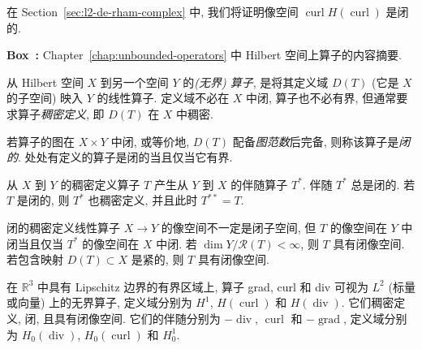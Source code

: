 在 Section~\ref{sec:l2-de-rham-complex} 中, 我们将证明像空间 $\operatorname{curl}H(\operatorname{curl})$ 是闭的.
\newpage
\begin{MBSourceBox}
\label{box:unbounded-operators-summary}
\noindent\textbf{Box~\thebooksummary:} {Chapter~\ref{chap:unbounded-operators} 中 Hilbert 空间上算子的内容摘要.}\par

从 Hilbert 空间 $X$ 到另一个空间 $Y$ 的\emph{(无界) 算子}, 是将其定义域 $D(T)$ (它是 $X$ 的子空间) 映入 $Y$ 的线性算子. 定义域不必在 $X$ 中闭, 算子也不必有界, 但通常要求算子\emph{稠密定义}, 即 $D(T)$ 在 $X$ 中稠密.

若算子的图在 $X\times Y$ 中闭, 或等价地, $D(T)$ 配备\emph{图范数}后完备, 则称该算子是\emph{闭的}. 处处有定义的算子是闭的当且仅当它有界.

从 $X$ 到 $Y$ 的稠密定义算子 $T$ 产生从 $Y$ 到 $X$ 的伴随算子 $T^*$. 伴随 $T^*$ 总是闭的. 若 $T$ 是闭的, 则 $T^*$ 也稠密定义, 并且此时 $T^{**}=T$.

闭的稠密定义线性算子 $X\to Y$ 的像空间不一定是闭子空间, 但 $T$ 的像空间在 $Y$ 中闭当且仅当 $T^*$ 的像空间在 $X$ 中闭. 若 $\dim Y/\mathcal R(T)<\infty$, 则 $T$ 具有闭像空间. 若包含映射 $D(T)\subset X$ 是紧的, 则 $T$ 具有闭像空间.

在 $\mathbb R^3$ 中具有 Lipschitz 边界的有界区域上, 算子 grad, curl 和 div 可视为 $L^2$ (标量或向量) 上的无界算子, 定义域分别为 $H^1$, $H(\operatorname{curl})$ 和 $H(\operatorname{div})$. 它们稠密定义, 闭, 且具有闭像空间. 它们的伴随分别为 $-\operatorname{div}$, $\operatorname{curl}$ 和 $-\operatorname{grad}$, 定义域分别为 $ H_0(\operatorname{div})$, $ H_0(\operatorname{curl})$ 和 $ H_0^1$.
\end{MBSourceBox}
